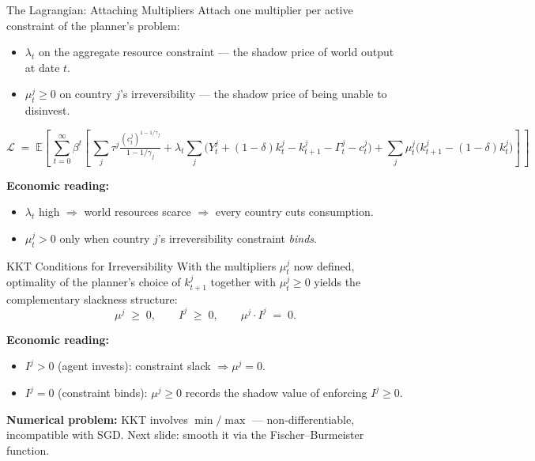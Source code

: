 \documentclass[aspectratio=169,11pt]{beamer}
\newcommand{\emphc}[1]{\textcolor{harvardcrimson}{#1}}
\newcommand{\E}[1]{\mathbb{E}\!\left[#1\right]}
\begin{document}
\begin{frame}{The Lagrangian: Attaching Multipliers}
\footnotesize
Attach one multiplier per active constraint of the planner's problem:
\begin{itemize}\itemsep2pt
    \item $\lambda_t$ on the aggregate resource constraint --- the \emphc{shadow price of world output} at date $t$.
    \item $\mu_t^j \geq 0$ on country $j$'s irreversibility --- the \emphc{shadow price of being unable to disinvest}.
\end{itemize}

\[
\mathcal{L} \;=\; \E{\,\sum_{t=0}^{\infty} \beta^{t}\!\left[\,
  \sum_{j} \tau^j \tfrac{(c_t^j)^{1-1/\gamma_j}}{1-1/\gamma_j}
  + \lambda_t\!\sum_{j}\!\bigl(Y_t^j + (1-\delta) k_t^j - k_{t+1}^j - \Gamma_t^j - c_t^j\bigr)
  + \sum_{j}\! \mu_t^j \bigl(k_{t+1}^j - (1-\delta) k_t^j\bigr)
\right]\,}
\]

\smallskip
\textbf{Economic reading:}
\begin{itemize}\itemsep1pt
    \item $\lambda_t$ high $\Rightarrow$ world resources scarce $\Rightarrow$ every country cuts consumption.
    \item $\mu_t^j > 0$ only when country $j$'s irreversibility constraint \emph{binds}.
\end{itemize}
\end{frame}

\begin{frame}{KKT Conditions for Irreversibility}
With the multipliers $\mu_t^j$ now defined, optimality of the planner's choice of $k_{t+1}^j$ together with $\mu_t^j \geq 0$ yields the \emphc{complementary slackness} structure:
\[
\mu^j \;\geq\; 0, \qquad I^j \;\geq\; 0, \qquad \mu^j \cdot I^j \;=\; 0.
\]

\smallskip
\textbf{Economic reading:}
\begin{itemize}\itemsep2pt
    \item $I^j > 0$ (agent invests): constraint slack $\Rightarrow \mu^j = 0$.
    \item $I^j = 0$ (constraint binds): $\mu^j \geq 0$ records the shadow value of enforcing $I^j \geq 0$.
\end{itemize}

\vspace{0.3em}
\textbf{Numerical problem:} KKT involves $\min/\max$ --- \emphc{non-differentiable}, incompatible with SGD. Next slide: smooth it via the Fischer--Burmeister function.
\end{frame}
\end{document}
